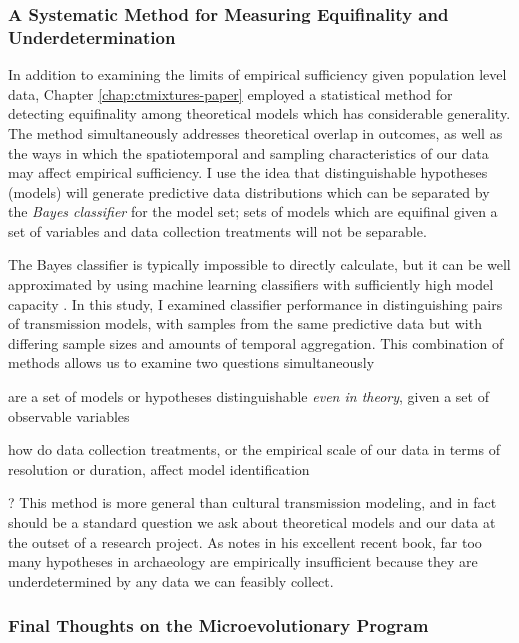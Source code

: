 \subsubsection{A Systematic Method for Measuring Equifinality and Underdetermination}\label{conc:sec:equifinality-underdetermination}

In addition to examining the limits of empirical sufficiency given population level data, Chapter \ref{chap:ctmixtures-paper} employed a statistical method for detecting equifinality among theoretical models which has considerable generality.  The method simultaneously addresses theoretical overlap in outcomes, as well as the ways in which the spatiotemporal and sampling characteristics of our data may affect empirical sufficiency.  I use the idea that distinguishable hypotheses (models) will generate predictive data distributions which can be separated by the \emph{Bayes classifier} for the model set; sets of models which are equifinal given a set of variables and data collection treatments will not be separable.

The Bayes classifier is typically impossible to directly calculate, but it can be well approximated by using machine learning classifiers with sufficiently high model capacity \citep{hastie2009elements}.  In this study, I examined classifier performance in distinguishing pairs of transmission models, with samples from the same predictive data but with differing sample sizes and amounts of temporal aggregation.  This combination of methods allows us to examine two questions simultaneously \begin{dissparalist}
\item are a set of models or hypotheses distinguishable \emph{even in theory}, given a set of observable variables
\item how do data collection treatments, or the empirical scale of our data in terms of resolution or duration, affect model identification
\end{dissparalist}?  This method is more general than cultural transmission modeling, and in fact should be a standard question we ask about theoretical models and our data at the outset of a research project.  As \citet{perreault2019quality} notes in his excellent recent book, far too many hypotheses in archaeology are empirically insufficient because they are underdetermined by any data we can feasibly collect.  


\subsubsection{Final Thoughts on the Microevolutionary Program}\label{conc:sec:final-micro}

